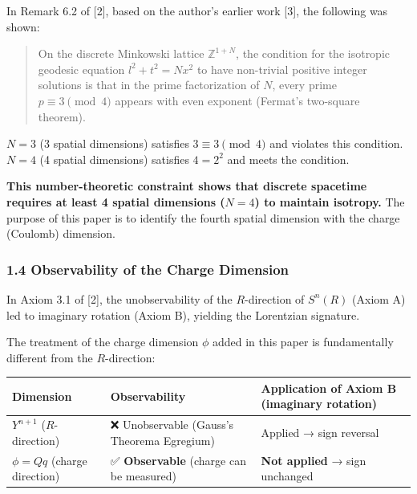 \documentclass[a4paper,11pt]{article}
\theoremstyle{definition}
\begin{document}
In Remark 6.2 of {[}2{]}, based on the author's earlier work {[}3{]}, the following was shown:

\begin{quote}
On the discrete Minkowski lattice \(\mathbb{Z}^{1+N}\), the condition for the isotropic geodesic equation \(l^2 + t^2 = Nx^2\) to have non-trivial positive integer solutions is that in the prime factorization of \(N\), every prime \(p \equiv 3 \pmod{4}\) appears with even exponent (Fermat's two-square theorem).
\end{quote}

\(N = 3\) (3 spatial dimensions) satisfies \(3 \equiv 3 \pmod{4}\) and violates this condition. \(N = 4\) (4 spatial dimensions) satisfies \(4 = 2^2\) and meets the condition.

\textbf{This number-theoretic constraint shows that discrete spacetime requires at least 4 spatial dimensions (\(N = 4\)) to maintain isotropy.} The purpose of this paper is to identify the fourth spatial dimension with the charge (Coulomb) dimension.

\subsubsection{1.4 Observability of the Charge Dimension}\label{observability-of-the-charge-dimension}

In Axiom 3.1 of {[}2{]}, the unobservability of the \(R\)-direction of \(S^n(R)\) (Axiom A) led to imaginary rotation (Axiom B), yielding the Lorentzian signature.

The treatment of the charge dimension \(\phi\) added in this paper is fundamentally different from the \(R\)-direction:

{\def\LTcaptype{none} %
\begin{longtable}[]{@{}
  >{\raggedright\arraybackslash}p{}
  >{\raggedright\arraybackslash}p{}
  >{\raggedright\arraybackslash}p{}@{}}
\toprule\noalign{}
\begin{minipage}[b]{\linewidth}\raggedright
Dimension
\end{minipage} & \begin{minipage}[b]{\linewidth}\raggedright
Observability
\end{minipage} & \begin{minipage}[b]{\linewidth}\raggedright
Application of Axiom B (imaginary rotation)
\end{minipage} \\
\midrule\noalign{}
\endhead
\bottomrule\noalign{}
\endlastfoot
\(Y^{n+1}\) (\(R\)-direction) & ❌ Unobservable (Gauss's Theorema Egregium) & Applied → sign reversal \\
\(\phi = Qq\) (charge direction) & ✅ \textbf{Observable} (charge can be measured) & \textbf{Not applied} → sign unchanged \\
\end{longtable}
}
\end{document}
